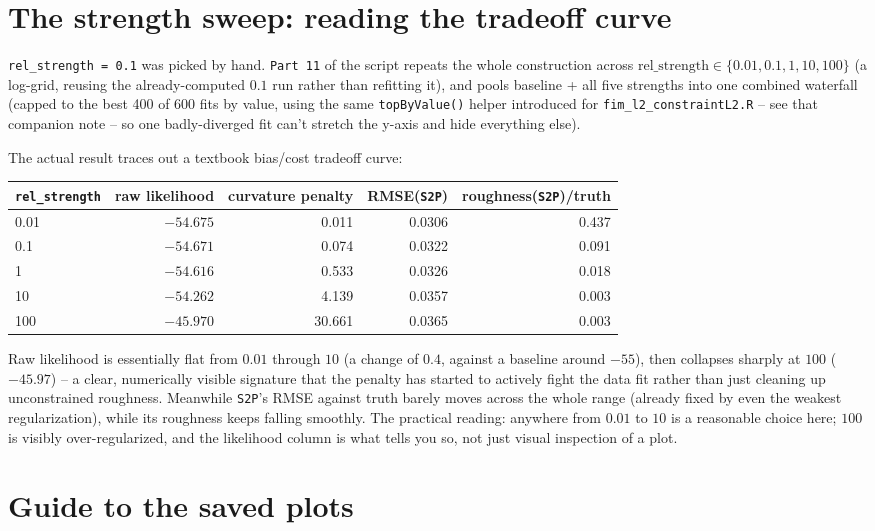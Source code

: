 \documentclass[11pt]{article}
\newcommand{\code}[1]{\texttt{#1}}
\newcommand{\file}[1]{\textcolor{black!60}{\texttt{#1}}}
\begin{document}
\section{The strength sweep: reading the tradeoff curve}

\code{rel\_strength = 0.1} was picked by hand. \file{Part 11} of the script
repeats the whole construction across
$\mathrm{rel\_strength}\in\{0.01,0.1,1,10,100\}$ (a log-grid, reusing the
already-computed $0.1$ run rather than refitting it), and pools baseline +
all five strengths into one combined waterfall
(capped to the best 400 of 600 fits by value, using the same
\code{topByValue()} helper introduced for \file{fim\_l2\_constraintL2.R} --
see that companion note -- so one badly-diverged fit can't stretch the
y-axis and hide everything else).

The actual result traces out a textbook bias/cost tradeoff curve:
\begin{center}
\begin{tabular}{@{}lrrrr@{}}
\toprule
\code{rel\_strength} & raw likelihood & curvature penalty & RMSE(\code{S2P}) & roughness(\code{S2P})/truth \\
\midrule
0.01  & $-54.675$ & 0.011  & 0.0306 & 0.437 \\
0.1   & $-54.671$ & 0.074  & 0.0322 & 0.091 \\
1     & $-54.616$ & 0.533  & 0.0326 & 0.018 \\
10    & $-54.262$ & 4.139  & 0.0357 & 0.003 \\
100   & $-45.970$ & 30.661 & 0.0365 & 0.003 \\
\bottomrule
\end{tabular}
\end{center}
Raw likelihood is essentially flat from $0.01$ through $10$ (a change of
$0.4$, against a baseline around $-55$), then collapses sharply at $100$
($-45.97$) -- a clear, numerically visible signature that the penalty has
started to actively fight the data fit rather than just cleaning up
unconstrained roughness. Meanwhile \code{S2P}'s RMSE against truth barely
moves across the whole range (already fixed by even the weakest
regularization), while its roughness keeps falling smoothly. The practical
reading: anywhere from $0.01$ to $10$ is a reasonable choice here; $100$ is
visibly over-regularized, and the likelihood column is what tells you so,
not just visual inspection of a plot.

\section{Guide to the saved plots}
\end{document}
